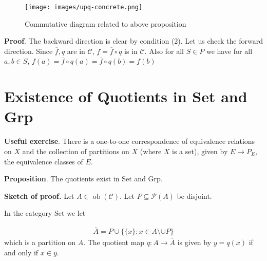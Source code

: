 \documentclass{article}
\begin{document}
\begin{figure}
\centering
\texttt{[image: images/upq-concrete.png]}
\caption{Commutative diagram related to above proposition}
\end{figure}


\textbf{Proof}. The backward direction is clear by condition (2). Let us check the forward direction. Since \(\overline{f}, q\) are in \(\mathcal{C}\), \(f = \overline{f} \circ q\) is in \(\mathcal{C}\). Also for all \(S \in P\) we have for all \(a,b \in S\), \(f(a) = \overline{f} \circ q(a) = \overline{f} \circ q(b) = f(b)\)

\chapter{Existence of Quotients in Set and Grp}

\textbf{Useful exercise}. There is a one-to-one correspondence of equivalence relations on \(X\) and the collection of partitions on \(X\) (where \(X\) is a set), given by \(E \to P_{E}\), the equivalence classes of \(E\).

\textbf{Proposition}. The quotients exist in \(\mathrm{Set}\) and \(\mathrm{Grp}\).

\textbf{Sketch of proof.} Let \(A \in \operatorname{ob}(\mathcal{C})\). Let \(P \subseteq \mathcal{P}(A)\) be disjoint.

In the category \(\mathrm{Set}\) we let

\begin{equation*}
\begin{split}\overline{A} = P \cup \{\{x\} : x \in A \setminus \cup P\}\end{split}\end{equation*}
which is a partition on \(A\). The quotient map \(q : A \to \overline{A}\) is given by \(y = q(x)\) if and only if \(x \in y\).
\end{document}
